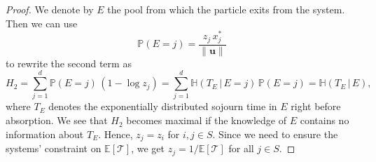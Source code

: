 \documentclass[smallextended]{svjour3}
\renewcommand{\vec}[1]{\mathbf{#1}}
\renewcommand{\P}{\mathbb{P}}
\newcommand{\E}{\mathbb{E}}
\newcommand{\TT}{\mathcal{T}}
\renewcommand{\H}{\mathbb{H}}
\newcommand{\suml}{\sum\limits}
\newcommand{\vnorms}[1]{\|#1\|}
\begin{document}
\begin{proof}
		We denote by $E$ the pool from which the particle exits from the system.
		Then we can use \citep[Sect.~5.3]{Metzler2018MGS}
		\begin{equation}
		  \P(E=j) = \frac{z_j\,x^\ast_j}{\vnorms{\vec{u}}}
		\end{equation}
    to rewrite the second term as
		\begin{equation}
			H_2 = \suml_{j=1}^d \P(E=j)\,(1-\log z_j) = \suml_{j=1}^d \H(T_E\,|\,E=j)\,\P(E=j) = \H(T_E\,|\,E),
		\end{equation}
		where $T_E$ denotes the exponentially distributed sojourn time in $E$ right before absorption.
		We see that $H_2$ becomes maximal if the knowledge of $E$ contains no information about $T_E$.
		Hence, $z_j=z_i$ for $i,j\in S$.
		Since we need to ensure the systems' constraint on $\E\left[\TT\right]$, we get $z_j=1/\E\left[\TT\right]$ for all $j\in S$.
		

\end{proof}
\end{document}
